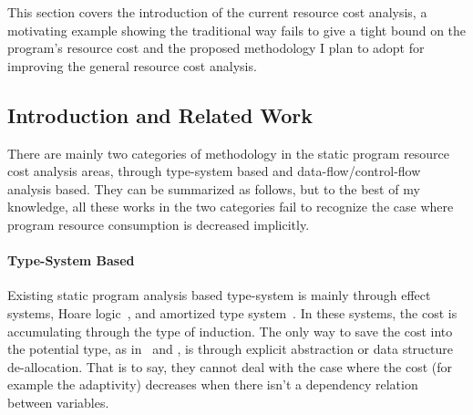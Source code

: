 This section covers the introduction of the current resource cost analysis, a 
motivating example showing the traditional way fails to give a tight bound on the program's resource cost 
and the proposed methodology I plan to adopt for improving the general resource cost analysis.
\subsection{Introduction and Related Work}
\label{subsubsec:furthers-cost-backgroung}
There are mainly two categories of methodology in the static program resource cost analysis areas, 
through type-system based and data-flow/control-flow analysis based. 
They can be summarized as follows, but to the best of my knowledge,
all these works in the two categories fail to recognize the case where program resource consumption is decreased implicitly.
 \paragraph*{Type-System Based}
Existing
static program analysis based type-system is mainly through 
effect systems, 
Hoare logic~\cite{gaboardi2021graded}, and amortized type system~\cite{hoffmann_jost_2022}.
%
In these systems, the cost is accumulating through the type of induction. 
The only way to save the cost into the potential
type, as in~\cite{GustafssonEL05} and \cite{hoffmann_jost_2022}, 
is through explicit abstraction or data structure de-allocation.
That is to say, they cannot deal with the case where the cost (for example the adaptivity) decreases when there isn't a dependency relation between variables.
